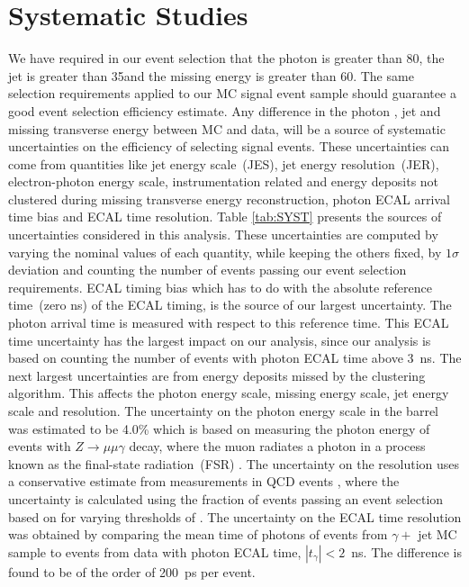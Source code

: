 \section{Systematic Studies}
We have required in our event selection that the photon \pt is greater than 80\GeVc, the jet \pt is greater than 35\GeVc and the missing energy is greater than 60\GeV. The same selection requirements applied to our MC signal event sample should guarantee a good event selection efficiency estimate. Any difference in the photon \pt, jet \pt and missing transverse energy between MC and data, will be a source of systematic uncertainties on the efficiency of selecting signal events. These uncertainties can come from quantities like jet energy scale~(JES), jet energy resolution~(JER), electron-photon energy scale, instrumentation related and energy deposits not clustered during missing transverse energy reconstruction, photon ECAL arrival time bias and ECAL time resolution. 
\newline
Table \ref{tab:SYST} presents the sources of uncertainties considered in this analysis. These uncertainties are computed by varying the nominal values of each quantity, while keeping the others fixed, by $1\sigma$ deviation and counting the number of events passing our event selection requirements. ECAL timing bias which has to do with the absolute reference time~(zero ns) of the ECAL timing, is the source of our largest uncertainty. The photon arrival time is measured with respect to this reference time. This ECAL time uncertainty has the largest impact on our analysis, since our analysis is based on counting the number of events with photon ECAL time above $3$~ns. The next largest uncertainties are from energy deposits missed by the clustering algorithm. This affects the photon energy scale, missing energy scale,  jet energy scale and resolution.
The uncertainty on the photon energy scale in the barrel was estimated to be 4.0\%  which is based on measuring the photon energy of events with $Z\rightarrow \mu\mu\gamma$ decay, where the muon radiates a photon in a process known as the final-state radiation~(FSR) \cite{PES}.  
\newline
The uncertainty on the \MET resolution uses a conservative estimate from \MET measurements in QCD events \cite{METRES}, where the \MET uncertainty is calculated using the fraction of events passing an event selection based on \MET for varying thresholds of \MET. 
\newline
The uncertainty on the ECAL time resolution was obtained by comparing the mean time of photons of events from $\gamma +$ jet MC sample to events from data with photon ECAL time, $|t_{\gamma}| < 2$~ns. The difference is found to be of the order of 200~ps per event. 
